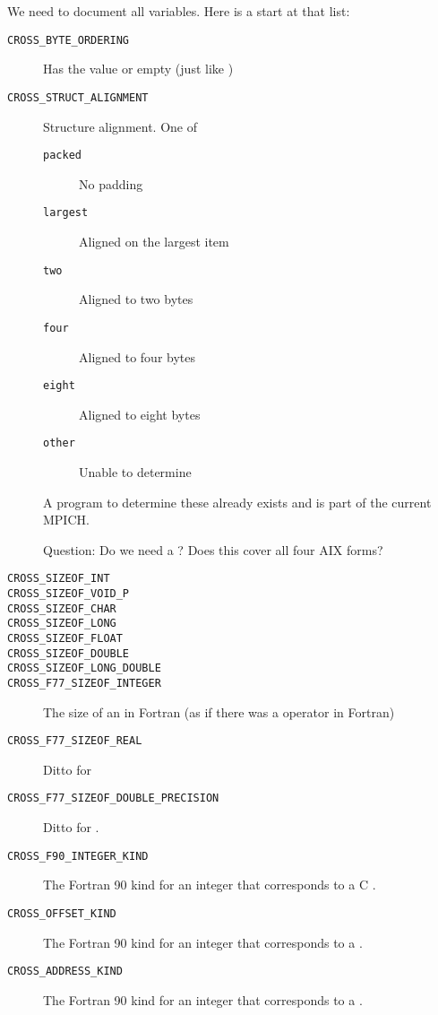 \documentclass{article}
\begin{document}
We need to document all  variables.  Here is a start at that
list:
\begin{description}
\item[\texttt{CROSS_BYTE_ORDERING}]Has the value  or
  empty (just like )
\item[\texttt{CROSS_STRUCT_ALIGNMENT}]Structure alignment.  One of 
    \begin{description}
    \item[\texttt{packed}]No padding
    \item[\texttt{largest}]Aligned on the largest item
    \item[\texttt{two}]Aligned to two bytes
    \item[\texttt{four}]Aligned to four bytes
    \item[\texttt{eight}]Aligned to eight bytes
    \item[\texttt{other}]Unable to determine
    \end{description}
    A program to determine these already exists and is part of the
    current MPICH.

    Question: Do we need a ?  Does this cover all four AIX forms?
\item[\texttt{CROSS_SIZEOF_INT}]
\item[\texttt{CROSS_SIZEOF_VOID_P}]
\item[\texttt{CROSS_SIZEOF_CHAR}]
\item[\texttt{CROSS_SIZEOF_LONG}]
\item[\texttt{CROSS_SIZEOF_FLOAT}]
\item[\texttt{CROSS_SIZEOF_DOUBLE}]
\item[\texttt{CROSS_SIZEOF_LONG_DOUBLE}]
\item[\texttt{CROSS_F77_SIZEOF_INTEGER}]The size of an  in
  Fortran (as if there was a  operator in Fortran)
\item[\texttt{CROSS_F77_SIZEOF_REAL}]Ditto for 
\item[\texttt{CROSS_F77_SIZEOF_DOUBLE_PRECISION}]Ditto for
.
\item[\texttt{CROSS_F90_INTEGER_KIND}]The Fortran 90 kind for an integer that
  corresponds to a C .
\item[\texttt{CROSS_OFFSET_KIND}]The Fortran 90 kind for an integer that
  corresponds to a .
\item[\texttt{CROSS_ADDRESS_KIND}]The Fortran 90 kind for an integer that
  corresponds to a .
\end{description}
\end{document}
